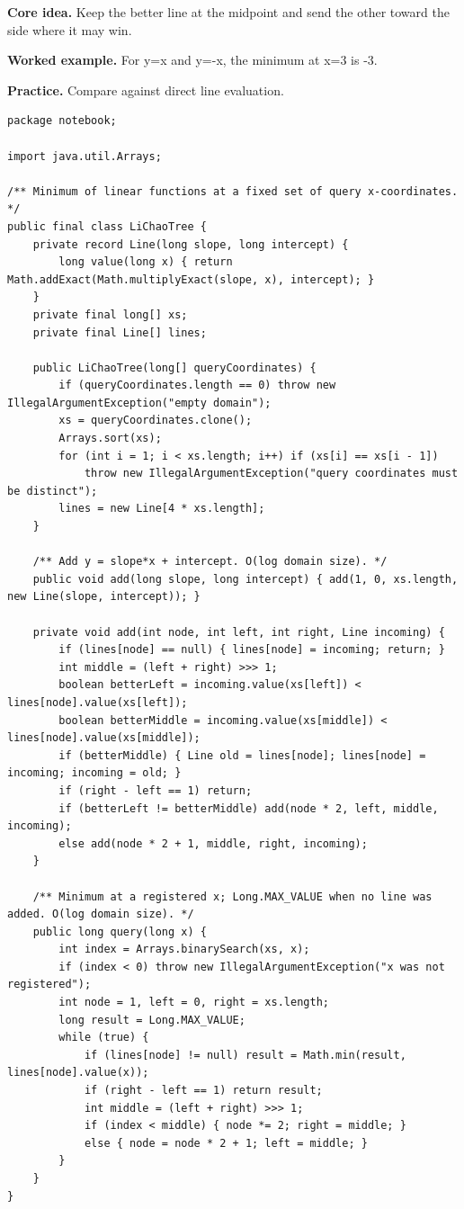 \documentclass[10pt,letterpaper]{article}
\begin{document}
\noindent\textbf{Core idea.} Keep the better line at the midpoint and send the other toward the side where it may win.\par
\noindent\textbf{Worked example.} For y=x and y=-x, the minimum at x=3 is -3.\par
\noindent\textbf{Practice.} Compare against direct line evaluation.\par
\begin{lstlisting}
package notebook;

import java.util.Arrays;

/** Minimum of linear functions at a fixed set of query x-coordinates. */
public final class LiChaoTree {
    private record Line(long slope, long intercept) {
        long value(long x) { return Math.addExact(Math.multiplyExact(slope, x), intercept); }
    }
    private final long[] xs;
    private final Line[] lines;

    public LiChaoTree(long[] queryCoordinates) {
        if (queryCoordinates.length == 0) throw new IllegalArgumentException("empty domain");
        xs = queryCoordinates.clone();
        Arrays.sort(xs);
        for (int i = 1; i < xs.length; i++) if (xs[i] == xs[i - 1])
            throw new IllegalArgumentException("query coordinates must be distinct");
        lines = new Line[4 * xs.length];
    }

    /** Add y = slope*x + intercept. O(log domain size). */
    public void add(long slope, long intercept) { add(1, 0, xs.length, new Line(slope, intercept)); }

    private void add(int node, int left, int right, Line incoming) {
        if (lines[node] == null) { lines[node] = incoming; return; }
        int middle = (left + right) >>> 1;
        boolean betterLeft = incoming.value(xs[left]) < lines[node].value(xs[left]);
        boolean betterMiddle = incoming.value(xs[middle]) < lines[node].value(xs[middle]);
        if (betterMiddle) { Line old = lines[node]; lines[node] = incoming; incoming = old; }
        if (right - left == 1) return;
        if (betterLeft != betterMiddle) add(node * 2, left, middle, incoming);
        else add(node * 2 + 1, middle, right, incoming);
    }

    /** Minimum at a registered x; Long.MAX_VALUE when no line was added. O(log domain size). */
    public long query(long x) {
        int index = Arrays.binarySearch(xs, x);
        if (index < 0) throw new IllegalArgumentException("x was not registered");
        int node = 1, left = 0, right = xs.length;
        long result = Long.MAX_VALUE;
        while (true) {
            if (lines[node] != null) result = Math.min(result, lines[node].value(x));
            if (right - left == 1) return result;
            int middle = (left + right) >>> 1;
            if (index < middle) { node *= 2; right = middle; }
            else { node = node * 2 + 1; left = middle; }
        }
    }
}
\end{lstlisting}
\end{document}
